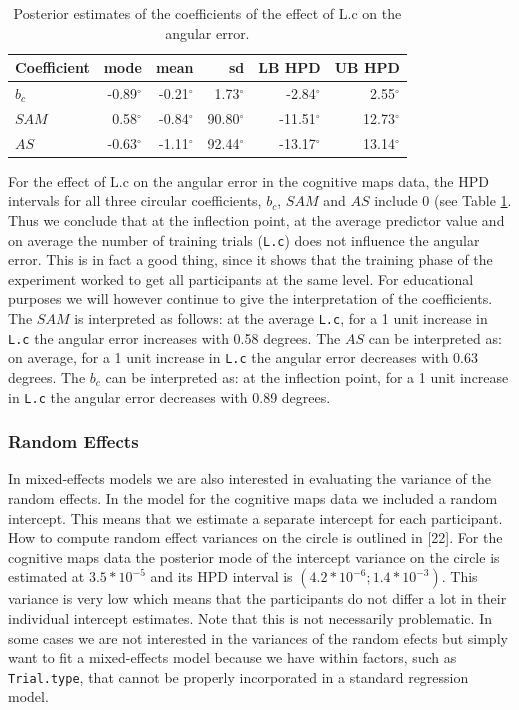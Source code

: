 \documentclass[11pt,]{article}
\begin{document}
\begin{table}
\centering
\caption{Posterior estimates of the coefficients of the effect of L.c on the angular error.} 
\begin{tabular}{lrrrrr}
  \hline\noalign{\smallskip}
Coefficient & mode & mean & sd & LB HPD & UB HPD  \\ \hline\noalign{\smallskip}
$b_c$ & -0.89$^{\circ}$ & -0.21$^{\circ}$ & 1.73$^{\circ}$ & -2.84$^{\circ}$ & 2.55$^{\circ}$\\
$SAM$ &  0.58$^{\circ}$ & -0.84$^{\circ}$ & 90.80$^{\circ}$ & -11.51$^{\circ}$ & 12.73$^{\circ}$   \\
$AS$  & -0.63$^{\circ}$  & -1.11$^{\circ}$  & 92.44$^{\circ}$ & -13.17$^{\circ}$ & 13.14$^{\circ}$ \\
   \hline
\end{tabular}
\label{TableResMapsLc}
\end{table}

For the effect of L.c on the angular error in the cognitive maps data,
the HPD intervals for all three circular coefficients, \(b_c\), \(SAM\)
and \(AS\) include 0 (see Table \ref{TableResMapsLc}. Thus we conclude
that at the inflection point, at the average predictor value and on
average the number of training trials (\verb|L.c|) does not influence
the angular error. This is in fact a good thing, since it shows that the
training phase of the experiment worked to get all participants at the
same level. For educational purposes we will however continue to give
the interpretation of the coefficients. The \(SAM\) is interpreted as
follows: at the average \verb|L.c|, for a 1 unit increase in \verb|L.c|
the angular error increases with 0.58 degrees. The \(AS\) can be
interpreted as: on average, for a 1 unit increase in \verb|L.c| the
angular error decreases with 0.63 degrees. The \(b_c\) can be
interpreted as: at the inflection point, for a 1 unit increase in
\verb|L.c| the angular error decreases with 0.89 degrees.

\subsubsection{Random Effects}\label{ranme}

In mixed-effects models we are also interested in evaluating the
variance of the random effects. In the model for the cognitive maps data
we included a random intercept. This means that we estimate a separate
intercept for each participant. How to compute random effect variances
on the circle is outlined in {[}22{]}. For the cognitive maps data the
posterior mode of the intercept variance on the circle is estimated at
\(3.5*10^{-5}\) and its HPD interval is \((4.2*10^{-6}; 1.4*10^{-3})\).
This variance is very low which means that the participants do not
differ a lot in their individual intercept estimates. Note that this is
not necessarily problematic. In some cases we are not interested in the
variances of the random efects but simply want to fit a mixed-effects
model because we have within factors, such as \verb|Trial.type|, that
cannot be properly incorporated in a standard regression model.
\end{document}
